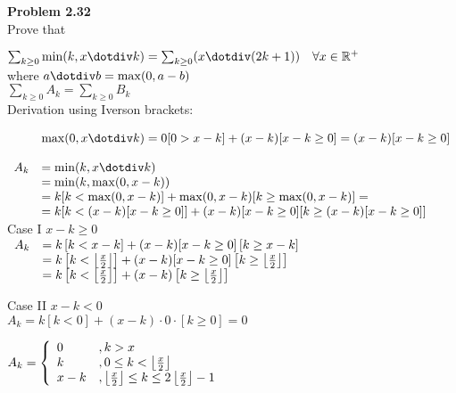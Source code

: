 \documentclass[10pt]{article}
\begin{document}
	
\everymath{\displaystyle}


\def\xt{\floor{\frac{x}{2}}}
\def\xp{\floor{\frac{x-1}{2}}}

\textbf{Problem 2.32}\\

Prove that

$\sum_{k\geq 0} \min(k,\monus{x}{k}) = \sum_{k\geq 0} (\monus{x}{(2k+1)}) \quad \forall x\in \mathbb{R}^+$\\

where $\monus{a}{b} = \max(0,a-b)$\\

$\sum_{k\geq 0} A_k = \sum_{k\geq 0} B_k$\\

Derivation using Iverson brackets:

$
\begin{array}{ll}
& \max(0,\monus{x}{k}) = 0 [0 > x-k] + (x-k)[x-k\geq 0] = (x-k)[x-k\geq 0] \\\\
A_k & = \min(k,\monus{x}{k}) \\
&  = \min(k,\max(0,x-k)) \\
&  = k [k < \max(0,x-k) ] + \max(0,x-k) [k\geq \max(0,x-k) ] = \\
&  = k [k < (x-k)[x-k\geq 0] ] + (x-k)[x-k\geq 0][k\geq (x-k)[x-k\geq 0] ] \\
\end{array}
$\\

Case I $x-k\geq 0$ \\

$
\begin{array}{ll}
A_k & = k \left[ k < x-k \right] + (x-k)[x-k\geq 0]\left[k \geq x-k \right]   \\
  & = k \left[ k < \left\lfloor {\frac{x}{2}} \right\rfloor \right] + (x-k)[x-k\geq 0]\left[k\geq \left\lfloor {\frac{x}{2}} \right\rfloor \right]   \\
  & = k \left[ k < \left\lfloor {\frac{x}{2}} \right\rfloor \right] + (x-k)\left[k\geq \left\lfloor {\frac{x}{2}} \right\rfloor \right] \\
\end{array}
$

Case II $x-k<0$ \\

$A_k = k [k < 0] + (x-k)\cdot 0 \cdot [k\geq 0] = 0$

$
A_k = 
\left\{
\begin{array}{ll}
	0 & , k > x\\
	k & , 0 \leq k < \floor{\frac{x}{2}} \\
	x-k & , \floor{\frac{x}{2}} \leq k \leq 2\xt - 1\\
\end{array}
\right.
$\\
\end{document}
